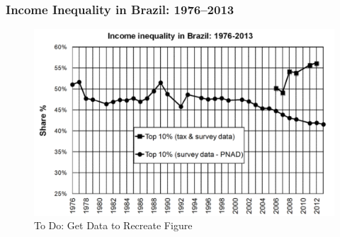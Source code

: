 \documentclass[t]{beamer}\usepackage[]{graphicx}\usepackage[]{color}
\begin{document}
\begin{frame}[label=BrazilInequality]
\frametitle{Income Inequality in Brazil: 1976--2013}
\begin{figure}[t]
\begin{minipage}[b]{\textwidth}
\centering
\includegraphics[width=\textwidth]
{pictures/IncomeInequalityBrazil}
\caption{To Do: Get Data to Recreate Figure}
\end{minipage}
\end{figure}
\end{frame}



\end{document}
